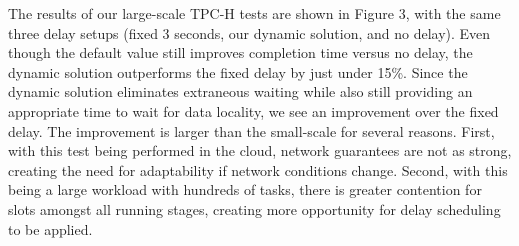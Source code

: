The results of our large-scale TPC-H tests are shown in Figure 3, with the same three 
delay setups (fixed 3 seconds, our dynamic solution, and no delay). Even though the default
value still improves completion time versus no delay, the dynamic solution outperforms 
the fixed delay by just under 15\%. Since the dynamic solution eliminates extraneous
waiting while also still providing an appropriate time to wait for data locality, we see
an improvement over the fixed delay. The improvement is larger than the small-scale for
several reasons. First, with this test being performed in the cloud, network guarantees
are not as strong, creating the need for adaptability if network conditions change. 
Second, with this being a large workload with hundreds of tasks, there is greater 
contention for slots amongst all running stages, creating more opportunity for delay 
scheduling to be applied.
